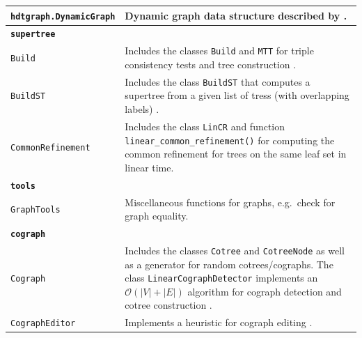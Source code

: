 \documentclass[hidelinks,11pt]{article}
\begin{document}
{\begin{longtable}{| p{4.0cm} | p{10cm} |}
    \texttt{hdtgraph.DynamicGraph} &
    Dynamic graph data structure described by \citet{holm2001}. \\
    \hline
    \multicolumn{2}{|l|}{\textbf{\texttt{supertree}}}\\
    \hline
    \texttt{Build} &
    Includes the classes \texttt{Build} and \texttt{MTT} for triple 
    consistency tests and tree construction \citep{aho1981, he2006}. \\
    \texttt{BuildST} &
    Includes the class \texttt{BuildST} that computes a supertree from a given 
    list of tress (with overlapping labels) \citep{deng2016}. \\
    \texttt{CommonRefinement} &
    Includes the class \texttt{LinCR} and function 
    \texttt{linear\_common\_refinement()} for computing the common refinement 
    for trees on the same leaf set in linear time. \\
    \hline
    \multicolumn{2}{|l|}{\textbf{\texttt{tools}}}\\
    \hline
    \texttt{GraphTools} &
    Miscellaneous functions for graphs, e.g.\ check for graph equality. \\
    \hline
    \multicolumn{2}{|l|}{\textbf{\texttt{cograph}}}\\
    \hline
    \texttt{Cograph} &
    Includes the classes \texttt{Cotree} and \texttt{CotreeNode} as well as a 
    generator for random cotrees/cographs. The class 
    \texttt{LinearCographDetector} implements an $\mathcal{O}(|V|+|E|)$ 
    algorithm 
    for cograph detection and cotree construction \citep{corneil1985}.\\
    \texttt{CographEditor} &
    Implements a heuristic for cograph editing \citep{crespelle2019}. \\
  \end{longtable}
}
\end{document}
